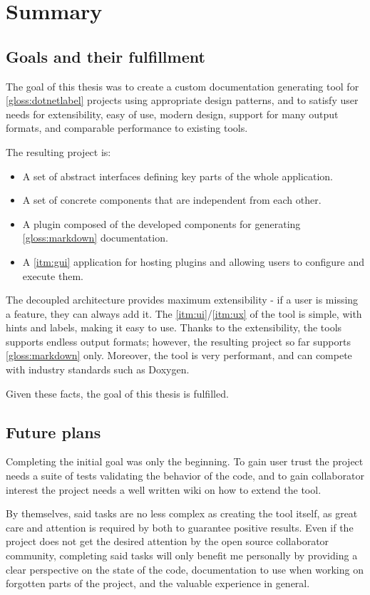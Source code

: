 \chapter*{Summary}

\section*{Goals and their fulfillment}

The goal of this thesis was to create a custom documentation generating tool for \ref{gloss:dotnetlabel} projects using appropriate design patterns, and to satisfy user needs for extensibility, easy of use, modern design, support for many output formats, and comparable performance to existing tools.

The resulting project is:
\begin{itemize}
    \item A set of abstract interfaces defining key parts of the whole application.
    \item A set of concrete components that are independent from each other.
    \item A plugin composed of the developed components for generating \ref{gloss:markdown} documentation.
    \item A \ref{itm:gui} application for hosting plugins and allowing users to configure and execute them.
\end{itemize}

The decoupled architecture provides maximum extensibility - if a user is missing a feature, they can always add it. The \ref{itm:ui}/\ref{itm:ux} of the tool is simple, with hints and labels, making it easy to use. Thanks to the extensibility, the tools supports endless output formats; however, the resulting project so far supports \ref{gloss:markdown} only. Moreover, the tool is very performant, and can compete with industry standards such as Doxygen.

Given these facts, the goal of this thesis is fulfilled.

\section*{Future plans}

Completing the initial goal was only the beginning. To gain user trust the project needs a suite of tests validating the behavior of the code, and to gain collaborator interest the project needs a well written wiki on how to extend the tool.

By themselves, said tasks are no less complex as creating the tool itself, as great care and attention is required by both to guarantee positive results. Even if the project does not get the desired attention by the open source collaborator community, completing said tasks will only benefit me personally by providing a clear perspective on the state of the code, documentation to use when working on forgotten parts of the project, and the valuable experience in general.
